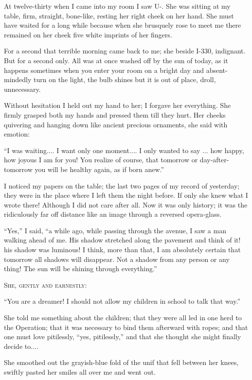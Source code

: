 \documentclass[11pt,openany]{book}
\begin{document}
At twelve-thirty when I came into my room I saw U-. She was sitting at my table, firm, straight, bone-like, resting her right cheek on her hand. She must have waited for a long while because when she brusquely rose to meet me there remained on her cheek five white imprints of her fingers.

For a second that terrible morning came back to me; she beside I-330, indignant. But for a second only. All was at once washed off by the sun of today, as it happens sometimes when you enter your room on a bright day and absent-mindedly turn on the light, the bulb shines but it is out of place, droll, unnecessary.

Without hesitation I held out my hand to her; I forgave her everything. She firmly grasped both my hands and pressed them till they hurt. Her cheeks quivering and hanging down like ancient precious ornaments, she said with emotion:

``I was waiting.... I want only one moment.... I only wanted to say ... how happy, how joyous I am for you! You realize of course, that tomorrow or day-after-tomorrow you will be healthy again, as if born anew.''

I noticed my papers on the table; the last two pages of my record of yesterday; they were in the place where I left them the night before. If only she knew what I wrote there! Although I did not care after all. Now it was only history; it was the ridiculously far off distance like an image through a reversed opera-glass.

``Yes,'' I said, ``a while ago, while passing through the avenue, I saw a man walking ahead of me. His shadow stretched along the pavement and think of it! his shadow was luminous! I think, more than that, I am absolutely certain that tomorrow all shadows will disappear. Not a shadow from any person or any thing! The sun will be shining through everything.''

\begin{center}\textsc{She, gently and earnestly:}\end{center}

``You are a dreamer! I should not allow my children in school to talk that way.''

She told me something about the children; that they were all led in one herd to the Operation; that it was necessary to bind them afterward with ropes; and that one must love pitilessly, ``yes, pitilessly,'' and that she thought she might finally decide to....

She smoothed out the grayish-blue fold of the unif that fell between her knees, swiftly pasted her smiles all over me and went out.
\end{document}
